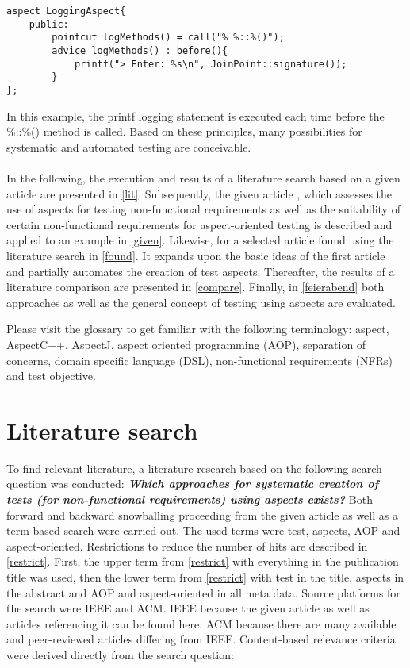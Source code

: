 \lstset {language=C++}
\begin{lstlisting}[caption={Logging Aspect in C++.}, label=logging]
aspect LoggingAspect{
	public:
		pointcut logMethods() = call("% %::%()");
		advice logMethods() : before(){
			printf("> Enter: %s\n", JoinPoint::signature());
		}
};
\end{lstlisting}

\newpage
In this example, the printf logging statement is executed each time before the \%::\%() method is called. Based on these principles, many possibilities for systematic and automated testing are conceivable.\\
\\
In the following, the execution and results of a literature search based on a given article are presented in \autoref{lit}. Subsequently, the given article , which assesses the use of aspects for testing non-functional requirements as well as the suitability of certain non-functional requirements for aspect-oriented testing is described and applied to an example in \autoref{given}. Likewise, for a selected article found using the literature search in \autoref{found}. It expands upon the basic ideas of the first article and partially automates the creation of test aspects. Thereafter, the results of a literature comparison are presented in \autoref{compare}. Finally, in \autoref{feierabend} both approaches as well as the general concept of testing using aspects are evaluated. 

Please visit the glossary to get familiar with the following terminology: aspect, AspectC++, AspectJ, aspect oriented programming (AOP), separation of concerns, domain specific language (DSL), non-functional requirements (NFRs) and test objective.

\section{ Literature search} \label{lit}

To find relevant literature, a literature research based on the following search question was conducted: \textbf{\textit{Which approaches for systematic creation of tests (for non-functional requirements) using aspects exists?}} Both forward and backward snowballing proceeding from the given article as well as a term-based search were carried out. The used terms were test, aspects, AOP and aspect-oriented. Restrictions to reduce the number of hits are described in \autoref{restrict}. First, the upper term from \autoref{restrict} with everything in the publication title was used, then the lower term from \autoref{restrict} with test in the title, aspects in the abstract and AOP and aspect-oriented in all meta data. Source platforms for the search were IEEE and ACM. IEEE because the given article as well as articles referencing it can be found here. ACM because there are many available and peer-reviewed articles differing from IEEE. Content-based relevance criteria were derived directly from the search question:

